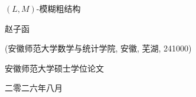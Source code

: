 \documentclass[12pt,oneside,openany,fontset=windows]{ctexbook}
\numberwithin{equation}{section}
\begin{document}
\begin{titlepage}
\vspace*{1cm} \LARGE\heiti\vspace*{-16.5pt}
\begin{center}
{\heiti{} $(L,M)$-模糊粗结构}
\end{center}
\vspace*{2mm}\songti

\begin{center}
{\Large{} 赵子函}
\end{center}

\Large\vspace*{0mm}
\begin{center}
(安徽师范大学数学与统计学院, 安徽, 芜湖, 241000)
\end{center}\vspace{6mm}
\vfill\large\baselineskip=31pt
\begin{center}
{安徽师范大学硕士学位论文}
\end{center}
\vspace*{-25.4pt}
\begin{center}
{二零二六年八月}
\end{center}
\end{titlepage}

\newpage
\pagestyle{plain}
\end{document}
